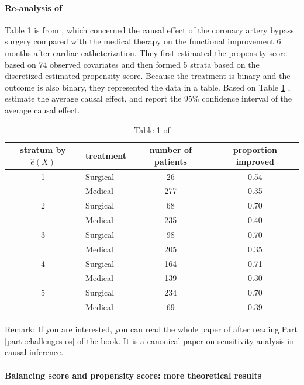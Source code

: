 \paragraph{Re-analysis of \citet{Rosenbaum::1983JRSSB}}



Table \ref{table::rr1983table1} is from \citet{Rosenbaum::1983JRSSB}, which concerned the causal effect of the coronary artery bypass surgery compared with the medical therapy on the functional improvement 6 months after cardiac catheterization.  They first estimated the propensity score based on 74 observed covariates and then formed 5 strata based on the discretized estimated propensity score. Because the treatment is binary and the outcome is also binary, they represented the data in a table. 
Based on Table \ref{table::rr1983table1} , estimate the average causal effect, and report the 95\% confidence interval of the average causal effect. 



\begin{table}
\caption{Table 1 of \citet{Rosenbaum::1983JRSSB}}\label{table::rr1983table1}
\begin{tabular}{clcc}
\hline 
stratum by $\hat{e}(X)$ & treatment &  number of patients & proportion improved\\
\hline 1 & Surgical & 26 & 0.54 \\
& Medical & 277 & 0.35 \\
2 & Surgical & 68 & 0.70 \\
& Medical & 235 & 0.40 \\
3 & Surgical & 98 & 0.70 \\
& Medical & 205 & 0.35 \\
4 & Surgical & 164 & 0.71 \\
& Medical & 139 & 0.30 \\
5 & Surgical & 234 & 0.70 \\
& Medical & 69 & 0.39 \\
\hline
\end{tabular}
\end{table}


Remark:   If you are interested, you can read the whole paper of \citet{Rosenbaum::1983JRSSB} after reading Part \ref{part::challenges-os} of the book. It is a canonical paper on sensitivity analysis in causal inference. 

 


\paragraph{Balancing score and propensity score: more theoretical results}
\label{hw::balancingscore-rr1983}


